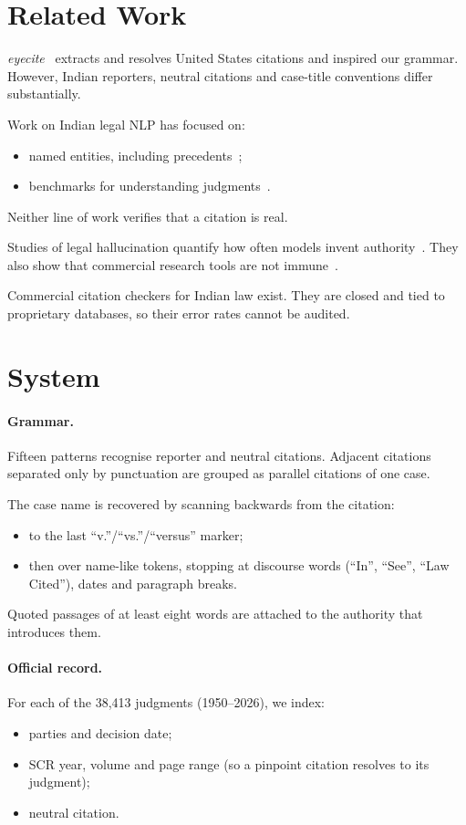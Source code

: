 \documentclass[sigconf,nonacm]{acmart}
\newcommand{\nJudgments}{38{,}413}
\begin{document}
\section{Related Work}

\emph{eyecite}~\cite{cushman2021eyecite} extracts and resolves United States citations and inspired
our grammar. However, Indian reporters, neutral citations and case-title conventions differ
substantially.

Work on Indian legal NLP has focused on:
\begin{itemize}
\item named entities, including precedents~\cite{kalamkar2022ner};
\item benchmarks for understanding judgments~\cite{joshi2024iltur}.
\end{itemize}
Neither line of work verifies that a citation is real.

Studies of legal hallucination quantify how often models invent authority~\cite{dahl2024fictions}.
They also show that commercial research tools are not immune~\cite{magesh2024hallucination}.

Commercial citation checkers for Indian law exist. They are closed and tied to proprietary databases,
so their error rates cannot be audited.

\section{System}

\paragraph{Grammar.}
Fifteen patterns recognise reporter and neutral citations. Adjacent citations separated only by
punctuation are grouped as parallel citations of one case.

The case name is recovered by scanning backwards from the citation:
\begin{itemize}
\item to the last ``v.''/``vs.''/``versus'' marker;
\item then over name-like tokens, stopping at discourse words (``In'', ``See'', ``Law Cited''),
dates and paragraph breaks.
\end{itemize}
Quoted passages of at least eight words are attached to the authority that introduces them.

\paragraph{Official record.}
For each of the \nJudgments{} judgments (1950--2026), we index:
\begin{itemize}
\item parties and decision date;
\item SCR year, volume and page range (so a pinpoint citation resolves to its judgment);
\item neutral citation.
\end{itemize}
\end{document}
